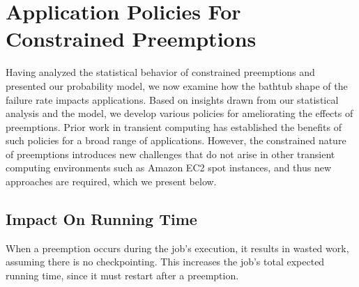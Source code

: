 
\section{Application Policies For Constrained Preemptions}
\label{sec:policies}
Having analyzed the statistical behavior of constrained preemptions and presented our probability model, we now examine how the bathtub shape of the failure rate impacts applications.
Based on insights drawn from our statistical analysis and the model, we develop various policies for ameliorating the effects of preemptions. 
Prior work in transient computing has established the benefits of such policies for a broad range of applications.
However, the constrained nature of preemptions introduces new challenges that do not arise in other transient computing environments such as Amazon EC2 spot instances, and thus new approaches are required, which we present below. 







\subsection{Impact On Running Time}

When a preemption occurs during the job's execution, it results in wasted work, assuming there is no checkpointing.
This increases the job's total expected running time, since it must restart after a preemption.

